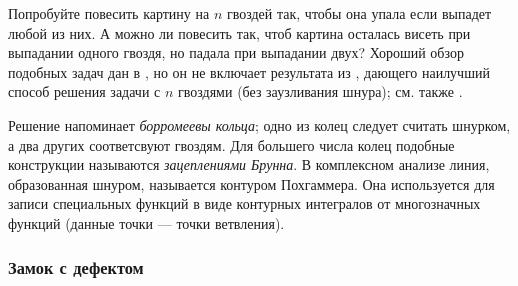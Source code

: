\begin{addedbytheeditors}
Попробуйте повесить картину на $n$ гвоздей так, чтобы она упала если выпадет любой из них.
А можно ли повесить так, чтоб картина осталась висеть при выпадании одного гвоздя, но падала при выпадании двух?
Хороший обзор подобных задач дан в \cite{demaine2014}, но он не включает результата из \cite{gartside-greenwood}, дающего наилучший способ решения задачи с $n$ гвоздями (без заузливания шнура); см. также \cite{epifanov}.

Решение напоминает \emph{борромеевы кольца};
одно из колец следует считать шнурком, а два других соответсвуют гвоздям.
Для большего числа колец подобные конструкции называются \emph{зацеплениями Брунна}.
В комплексном анализе линия, образованная шнуром, называется контуром Похгаммера.
Она используется для записи специальных функций в виде контурных интегралов от многозначных функций (данные точки --- точки ветвления).
\end{addedbytheeditors}

\subsubsection*{Замок с дефектом}


